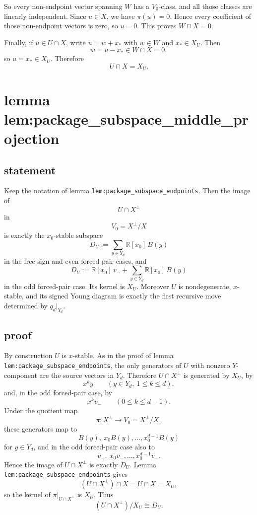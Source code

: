 \documentclass[
]{article}
\begin{document}
So every non-endpoint vector spanning \(W\) has a \(V_0\)-class, and all
those classes are linearly independent. Since \(u\in X\), we have
\(\pi(u)=0\). Hence every coefficient of those non-endpoint vectors is
zero, so \(u=0\). This proves \(W\cap X=0\).

Finally, if \(u\in U\cap X\), write \(u=w+x_*\) with \(w\in W\) and
\(x_*\in X_U\). Then \[
w=u-x_*\in W\cap X=0,
\] so \(u=x_*\in X_U\). Therefore \[
U\cap X=X_U.
\]

\section{lemma
lem:package\_subspace\_middle\_projection}\label{lemma-lempackage_subspace_middle_projection}

\subsection{statement}\label{statement-17}

Keep the notation of lemma \texttt{lem:package\_subspace\_endpoints}.
Then the image of \[
U\cap X^\perp
\] in \[
V_0=X^\perp/X
\] is exactly the \(x_0\)-stable subspace \[
D_U:=\sum_{y\in Y_d}\mathbb R[x_0]\,B(y)
\] in the free-sign and even forced-pair cases, and \[
D_U:=\mathbb R[x_0]\,v_-+\sum_{y\in Y_d}\mathbb R[x_0]\,B(y)
\] in the odd forced-pair case. Its kernel is \(X_U\). Moreover \(U\) is
nondegenerate, \(x\)-stable, and its signed Young diagram is exactly the
first recursive move determined by \(q_d|_{Y_d}\).

\subsection{proof}\label{proof-17}

By construction \(U\) is \(x\)-stable. As in the proof of lemma
\texttt{lem:package\_subspace\_endpoints}, the only generators of \(U\)
with nonzero \(Y\)-component are the source vectors in \(Y_d\).
Therefore \(U\cap X^\perp\) is generated by \(X_U\), by \[
x^k y\qquad (y\in Y_d,\ 1\le k\le d),
\] and, in the odd forced-pair case, by \[
x^k v_-\qquad (0\le k\le d-1).
\] Under the quotient map \[
\pi:X^\perp\to V_0=X^\perp/X,
\] these generators map to \[
B(y),\ x_0B(y),\dots,x_0^{d-1}B(y)
\] for \(y\in Y_d\), and in the odd forced-pair case also to \[
v_-,\ x_0v_-,\dots,x_0^{d-1}v_-.
\] Hence the image of \(U\cap X^\perp\) is exactly \(D_U\). Lemma
\texttt{lem:package\_subspace\_endpoints} gives \[
(U\cap X^\perp)\cap X=U\cap X=X_U,
\] so the kernel of \(\pi|_{U\cap X^\perp}\) is \(X_U\). Thus \[
(U\cap X^\perp)/X_U\cong D_U.
\]
\end{document}
